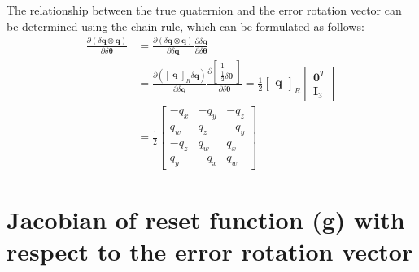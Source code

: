 The relationship between the true quaternion and the error rotation vector can be determined using the chain rule, which can be formulated as follows:
\begin{equation}
\begin{aligned}
    \frac{\partial(\delta\mathbf{q}\otimes\mathbf{q})}{\partial\delta\boldsymbol{\theta}} &=
    \frac{\partial(\delta\mathbf{q}\otimes\mathbf{q})}{\partial\delta\mathbf{q}}
    \frac{\partial\delta\mathbf{q}}{\partial\delta\boldsymbol{\theta}} \\
    &= \frac{\partial\left(\begin{bmatrix}
        \mathbf{q}
    \end{bmatrix}_R \delta\mathbf{q}\right)}{\partial\delta\mathbf{q}}
    \frac{\partial\begin{bmatrix}
        1 \\ \frac{1}{2}\delta\boldsymbol{\theta}
    \end{bmatrix}}{\partial\delta\boldsymbol{\theta}}=\frac{1}{2}\begin{bmatrix}
        \mathbf{q}
    \end{bmatrix}_R\begin{bmatrix}
        \mathbf{0}^T \\ \mathbf{I}_3 
    \end{bmatrix} \\
    &=\frac{1}{2}\begin{bmatrix}
        -q_x & -q_y & -q_z \\
        q_w & q_z & -q_y \\
        -q_z & q_w & q_x \\
        q_y & -q_x & q_w
    \end{bmatrix}
\end{aligned}
\end{equation}

\section{Jacobian of reset function (g) with respect to the error rotation vector}\label{app:der-g-by-rotvec}

